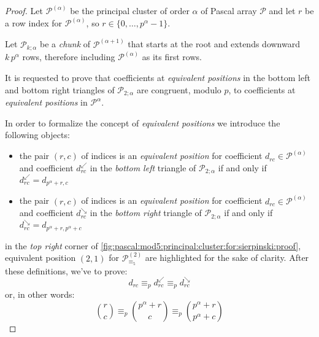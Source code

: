 \begin{proof}

  Let $\mathcal{P}^{(\alpha)}$ be the principal cluster of order $\alpha$ of
  Pascal array $\mathcal{P}$ and let $r$ be a row index for
  $\mathcal{P}^{(\alpha)}$, so $r \in \lbrace 0, \ldots, p^{\alpha} -1
  \rbrace$.
    
  Let $\mathcal{P}_{k;\alpha}$ be a \emph{chunk} of $\mathcal{P}^{(\alpha +1)}$
  that starts at the root and extends downward $k\,p^{\alpha}$ rows, therefore
  including $\mathcal{P}^{(\alpha)}$ as its first rows. 
  
  It is requested to
  prove that coefficients at \emph{equivalent positions} in the bottom left and
  bottom right triangles of $\mathcal{P}_{2;\alpha}$ are congruent, modulo $p$,
  to coefficients at \emph{equivalent positions} in $\mathcal{P}^{\alpha}$. 
  
  In order to formalize  the concept of \emph{equivalent positions} we
  introduce the following objects: 
  \begin{itemize}
    \item the pair $(r,c)$ of indices is an \emph{equivalent position} 
        for coefficient $d_{rc}\in\mathcal{P}^{(\alpha)}$ and coefficient 
            $d_{rc}^{\swarrow}$ in the \emph{bottom left} triangle of $\mathcal{P}_{2;\alpha}$ if and only if
                $d_{rc}^{\swarrow} = d_{p^{\alpha}+r,c}$
    \item the pair $(r,c)$ of indices is an \emph{equivalent position} 
        for coefficient $d_{rc}\in\mathcal{P}^{(\alpha)}$ and coefficient 
            $d_{rc}^{\searrow}$ in the \emph{bottom right} triangle of $\mathcal{P}_{2;\alpha}$ if and only if
                $d_{rc}^{\searrow} = d_{p^{\alpha}+r,p^{\alpha}+c}$
  \end{itemize}
  in the \emph{top right} corner of \autoref{fig:pascal:mod5:principal:cluster:for:sierpinski:proof},
  equivalent position $(2,1)$ for $\mathcal{P}_{\equiv_{5}}^{(2)}$ are highlighted 
  for the sake of clarity.  After these definitions, we've to prove:
  \begin{displaymath}
    d_{rc} \equiv_p d_{rc}^{\swarrow} \equiv_p d_{rc}^{\searrow} 
  \end{displaymath}
  or, in other words:
  \begin{displaymath}
    {{r} \choose {c}} \equiv_p {{p^{\alpha}+r} \choose {c}} \equiv_p {{p^{\alpha}+r} \choose {p^{\alpha}+c}} 
  \end{displaymath}


\end{proof}
